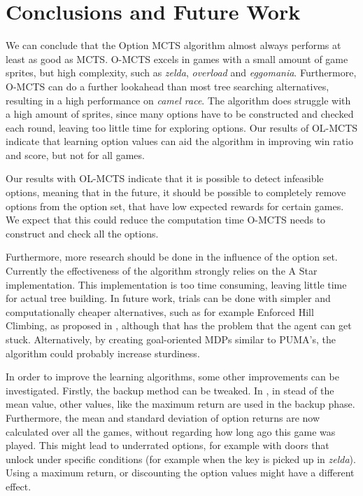 \section{Conclusions and Future Work}
\label{sec:conclusion}
We can conclude that the Option MCTS algorithm almost always performs at least
as good as MCTS. O-MCTS excels in games with a small amount of game sprites, but
high complexity, such as \textit{zelda}, \textit{overload} and \textit{eggomania}.
Furthermore, O-MCTS can do a further lookahead than most tree searching
alternatives, resulting in a high performance on \textit{camel race}. The
algorithm does struggle with a high amount of sprites, since many options have
to be constructed and checked each round, leaving too little time for exploring
options. Our results of OL-MCTS indicate that learning
option values can aid the algorithm in improving win ratio and score, but not
for all games.

Our results with OL-MCTS indicate that it is possible to detect infeasible
options, meaning that in the future, it should be possible to completely remove
options from the option set, that have low expected rewards for certain games.
We expect that this could reduce the computation time O-MCTS needs to construct
and check all the options.

Furthermore, more research should be done in the influence of the option set.
Currently the effectiveness of the algorithm strongly relies on the A Star
implementation. This implementation is too time consuming, leaving
little time for actual tree building. In future work, trials can be done with
simpler and computationally cheaper alternatives, such as for example Enforced
Hill Climbing, as proposed in \cite{ross2014general}, although that has the
problem that the agent can get stuck. Alternatively, by creating goal-oriented
MDPs similar to PUMA's, the algorithm could probably increase sturdiness.

In order to improve the learning algorithms, some other improvements can be
investigated. Firstly, the backup method can be tweaked. In
\cite{coulom2007efficient}, in stead of the mean value, other values, like the
maximum return are used in the backup phase. Furthermore, the mean and standard
deviation of option returns are now calculated over all the games, without
regarding how long ago this game was played. This might lead to underrated
options, for example with doors that unlock under specific conditions (for
example when the key is picked up in \textit{zelda}).  Using a maximum return,
or discounting the option values might have a different effect.

